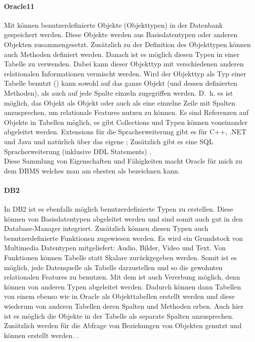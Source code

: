 \paragraph{Oracle11}
Mit  können benutzerdefinierte Objekte (Objekttypen) in der Datenbank gespeichert werden. Diese Objekte werden aus Basisdatentypen oder anderen Objekten zusammengesetzt. Zusätzlich zu der Definition des Objekttypen können auch Methoden definiert werden. Danach ist es möglich diesen Typen in einer Tabelle zu verwenden. Dabei kann dieser Objekttyp mit verschiedenen anderen relationalen Informationen vermischt werden. Wird der Objekttyp als Typ einer Tabelle benutzt () kann sowohl auf das ganze Objekt (und dessen definierten Methoden), als auch auf jede Spalte einzeln zugegriffen werden. D.~h. es ist möglich, das Objekt als Objekt oder auch als eine einzelne Zeile mit Spalten anzusprechen, um relationale Features nutzen zu können. Es sind Referenzen auf Objekte in Tabellen möglich, es gibt Collections und Typen können voneinander abgeleitet werden. Extensions für die Spracherweiterung gibt es für C++, .NET und Java und natürlich über das eigene ; Zusätzlich gibt es eine SQL Spracherweiterung (inklusive DDL Statements) \cite{oracle-db-object-relational-guide}.\\
Diese Sammlung von Eigenschaften und Fähigkeiten macht Oracle für mich zu dem DBMS welches man am ehesten als \ORDBMS bezeichnen kann.\\

\paragraph{DB2}
In DB2 ist es ebenfalls möglich benutzerdefinierte Typen zu erstellen. Diese  können von Basisdatentypen abgeleitet werden und sind somit auch gut in den Database-Manager integriert. Zusätzlich können diesen Typen auch benutzerdefinierte Funktionen zugewiesen werden. Es wird ein Grundstock von Multimedia Datentypen mitgeliefert: Audio, Bilder, Video und Text. Von Funktionen können Tabelle statt Skalare zurückgegeben werden. Somit ist es möglich, jede Datenquelle als Tabelle darzustellen und so die gewohnten relationalen Features zu benutzen. Mit dem  ist auch Vererbung möglich, denn  können von anderen Typen abgeleitet werden. Dadurch können dann Tabellen von einem  ebenso wie in Oracle als Objekttabellen erstellt werden und diese wiederum von anderen Tabellen deren Spalten und Methoden erben. Auch hier ist es möglich die Objekte in der Tabelle als separate Spalten anzusprechen. Zusätzlich werden  für die Abfrage von Beziehungen von Objekten genutzt und  können erstellt werden. \cite{db2-object-relational-highlight}.\\

